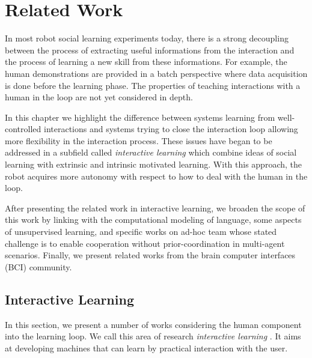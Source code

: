 
\chapter{Related Work}
\label{chapter:relatedwork}
\minitoc


In most robot social learning experiments today, there is a strong decoupling between the process of extracting useful informations from the interaction and the process of learning a new skill from these informations. For example, the human demonstrations are provided in a batch perspective where data acquisition is done before the learning phase. The properties of teaching interactions with a human in the loop are not yet considered in depth.

In this chapter we highlight the difference between systems learning from well-controlled interactions and systems trying to close the interaction loop allowing more flexibility in the interaction process. These issues have began to be addressed in a subfield called \emph{interactive learning}  which combine ideas of social learning with extrinsic and intrinsic motivated learning. With this approach, the robot acquires more autonomy with respect to how to deal with the human in the loop. 

After presenting the related work in interactive learning, we broaden the scope of this work by linking with the computational modeling of language, some aspects of unsupervised learning, and specific works on ad-hoc team whose stated challenge is to enable cooperation without prior-coordination in multi-agent scenarios. Finally, we present related works from the brain computer interfaces (BCI) community.

\section{Interactive Learning}

In this section, we present a number of works considering the human component into the learning loop. We call this area of research \emph{interactive learning} \cite{nicolescu2003natural,breazeal2004tutelage}. It aims at developing machines that can learn by practical interaction with the user.

